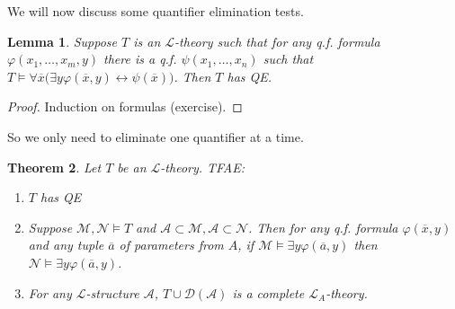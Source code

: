 \documentclass[]{article}
\theoremstyle{custhm}
\newtheorem{theorem}{Theorem}[section]
\theoremstyle{cusdef}
\theoremstyle{custhm}
\newtheorem{lemma}[theorem]{Lemma}
\theoremstyle{custhm}
\theoremstyle{custhm}
\theoremstyle{ex}
\theoremstyle{custhm}
\theoremstyle{cusdef}
\theoremstyle{remark}
\theoremstyle{remark}
\renewcommand{\L}{\mathcal{L}}
\newcommand{\M}{\mathcal{M}}
\renewcommand{\phi}{\varphi}
\renewcommand{\bar}{\overline}
\newcommand{\N}{\mathcal{N}}
\newcommand{\A}{\mathcal{A}}
\begin{document}
We will now discuss some quantifier elimination tests.

\begin{lemma}
Suppose $T$ is an $\L$-theory such that for any q.f. formula $\phi(x_1,\dots,x_m,y)$ there is a q.f. $\psi(x_1,\dots,x_n)$ such that $T\models \forall \bar{x}\big(\exists y \phi(\bar{x},y)\leftrightarrow \psi(\bar{x})\big)$. Then $T$ has QE.
\end{lemma}
\begin{proof}
Induction on formulas (exercise).
\end{proof}

So we only need to eliminate one quantifier at a time.

\begin{theorem}
Let $T$ be an $\L$-theory. TFAE:
\begin{enumerate}[label=\roman*)]
	\item $T$ has QE
	\item Suppose $\M,\N\models T$ and $\A\subset\M,\A\subset\N$. Then for any q.f. formula $\phi(\bar{x},y)$ and any tuple $\bar{a}$ of parameters from $A$, if $\M\models \exists y\phi(\bar{a},y)$ then $\N\models \exists y \phi(\bar{a},y)$.
	\item For any $\L$-structure $\A$, $T\cup \mathcal{D}(\A)$ is a complete $\L_A$-theory.
\end{enumerate}
\end{theorem}
\end{document}
